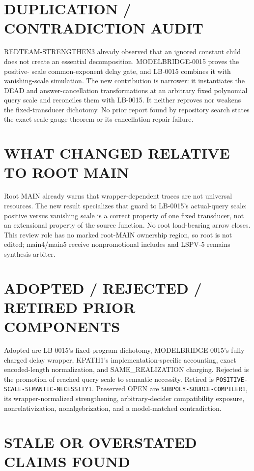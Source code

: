 \documentclass[11pt]{article}
\begin{document}
\section{DUPLICATION / CONTRADICTION AUDIT}

REDTEAM-STRENGTHEN3 already observed that an ignored constant child does not
create an essential decomposition.  MODELBRIDGE-0015 proves the positive-
scale common-exponent delay gate, and LB-0015 combines it with vanishing-scale
simulation.  The new contribution is narrower: it instantiates the DEAD and
answer-cancellation transformations at an arbitrary fixed polynomial query
scale and reconciles them with LB-0015.  It neither reproves nor weakens the
fixed-transducer dichotomy.  No prior report found by repository search states
the exact scale-gauge theorem or its cancellation repair failure.

\section{WHAT CHANGED RELATIVE TO ROOT MAIN}

Root MAIN already warns that wrapper-dependent traces are not universal
resources.  The new result specializes that guard to LB-0015's actual-query
scale: positive versus vanishing scale is a correct property of one fixed
transducer, not an extensional property of the source function.  No root
load-bearing arrow closes.  This review role has no marked root-MAIN
ownership region, so root  is not edited; main4/main5 receive
nonpromotional includes and LSPV-5 remains synthesis arbiter.

\section{ADOPTED / REJECTED / RETIRED PRIOR COMPONENTS}

Adopted are LB-0015's fixed-program dichotomy, MODELBRIDGE-0015's fully
charged delay wrapper, KPATH1's implementation-specific accounting, exact
encoded-length normalization, and SAME\_REALIZATION charging.  Rejected is
the promotion of reached query scale to semantic necessity.  Retired is
\texttt{POSITIVE-SCALE-SEMANTIC-NECESSITY1}.  Preserved OPEN are
\texttt{SUBPOLY-SOURCE-COMPILER1}, its wrapper-normalized strengthening,
arbitrary-decider compatibility exposure, nonrelativization,
nonalgebrization, and a model-matched contradiction.

\section{STALE OR OVERSTATED CLAIMS FOUND}
\end{document}
